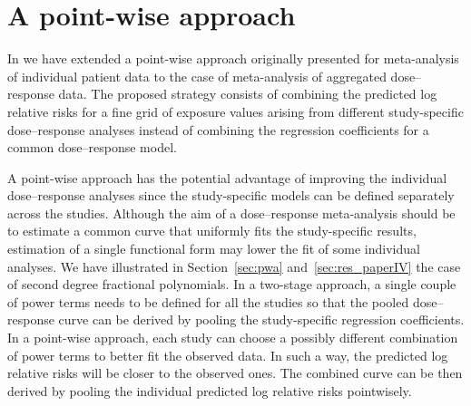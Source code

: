 \documentclass[11pt,a4paper,twoside,openany]{book}\usepackage{knitr}
\begin{document}
{\section{A point-wise approach}

In  we have extended a point-wise approach originally presented for meta-analysis of individual patient data to the case of meta-analysis of aggregated dose--response data.  The proposed strategy consists of combining the predicted log relative risks for a fine grid of exposure values arising from different study-specific dose--response analyses instead of combining the regression coefficients for a common dose--response model.

A point-wise approach has the potential advantage of improving the individual dose--response analyses since the study-specific models can be defined separately across the studies. Although the aim of a dose--response meta-analysis should be to estimate a common curve that uniformly fits the study-specific results, estimation of a single functional form may lower the fit of some individual analyses. We have illustrated in Section~\ref{sec:pwa} and~\ref{sec:res_paperIV} the case of second degree fractional polynomials. In a two-stage approach, a single couple of power terms needs to be defined for all the studies so that the pooled dose--response curve can be derived by pooling the study-specific regression coefficients. In a point-wise approach, each study can choose a possibly different combination of power terms to better fit the observed data. In such a way, the predicted log relative risks will be closer to the observed ones. The combined curve can be then derived by pooling the individual predicted log relative risks pointwisely.

}
\end{document}
